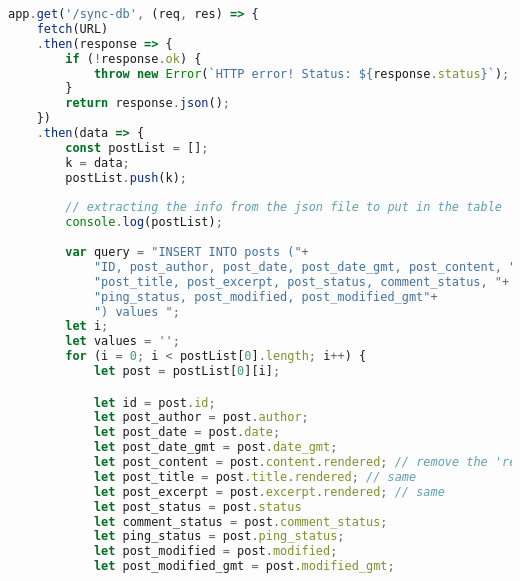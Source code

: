 \documentclass{article}
\begin{document}
\begin{lstlisting}[language=JavaScript, caption={Implementazione dell'endpoint per sincronizzare il database con i post dal feed}, label={lst:syncDbEndpoint}]
app.get('/sync-db', (req, res) => {
    fetch(URL)
    .then(response => {
        if (!response.ok) {
            throw new Error(`HTTP error! Status: ${response.status}`);
        }
        return response.json();
    })
    .then(data => {
        const postList = [];
        k = data;
        postList.push(k);
        
        // extracting the info from the json file to put in the table
        console.log(postList);
        
        var query = "INSERT INTO posts ("+
            "ID, post_author, post_date, post_date_gmt, post_content, "+
            "post_title, post_excerpt, post_status, comment_status, "+
            "ping_status, post_modified, post_modified_gmt"+
            ") values ";
        let i;
        let values = '';
        for (i = 0; i < postList[0].length; i++) {
            let post = postList[0][i];

            let id = post.id;
            let post_author = post.author;
            let post_date = post.date;
            let post_date_gmt = post.date_gmt;
            let post_content = post.content.rendered; // remove the 'rendered' if it doesn't work
            let post_title = post.title.rendered; // same
            let post_excerpt = post.excerpt.rendered; // same
            let post_status = post.status
            let comment_status = post.comment_status; 
            let ping_status = post.ping_status; 
            let post_modified = post.modified;
            let post_modified_gmt = post.modified_gmt;
            

\end{lstlisting}
\end{document}
